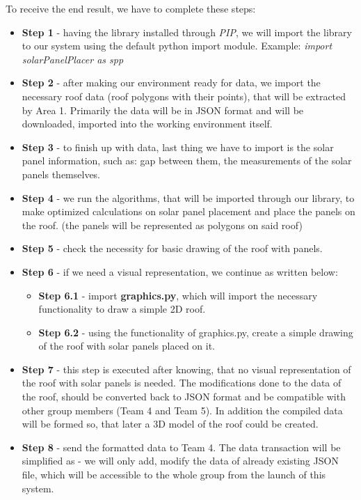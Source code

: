 \documentclass[a4paper,12pt,fleqn]{article}
\begin{document}
To receive the end result, we have to complete these steps:
\begin{itemize}
    \item \textbf{Step 1} - having the library installed through \textit{PIP}, we will import the library to our system using the default python import module. Example: \textit{import solarPanelPlacer as spp}
    \item \textbf{Step 2} - after making our environment ready for data, we import the necessary roof data (roof polygons with their points), that will be extracted by Area 1. Primarily the data will be in JSON format and will be downloaded, imported into the working environment itself.
    \item \textbf{Step 3} - to finish up with data, last thing we have to import is the solar panel information, such as: gap between them, the measurements of the solar panels themselves.
    \item \textbf{Step 4} - we run the algorithms, that will be imported through our library, to make optimized calculations on solar panel placement and place the panels on the roof. (the panels will be represented as polygons on said roof)
    \item \textbf{Step 5} - check the necessity for basic drawing of the roof with panels.
    \item \textbf{Step 6} - if we need a visual representation, we continue as written below:
    \begin{itemize}
        \item \textbf{Step 6.1} - import \textbf{graphics.py}, which will import the necessary functionality to draw a simple 2D roof.
        \item \textbf{Step 6.2} - using the functionality of graphics.py, create a simple drawing of the roof with solar panels placed on it.
    \end{itemize}
    \item \textbf{Step 7} - this step is executed after knowing, that no visual representation of the roof with solar panels is needed. The modifications done to the data of the roof, should be converted back to JSON format and be compatible with other group members (Team 4 and Team 5). In addition the compiled data will be formed so, that later a 3D model of the roof could be created.
    \item \textbf{Step 8} - send the formatted data to Team 4. The data transaction will be simplified as - we will only add, modify the data of already existing JSON file, which will be accessible to the whole group from the launch of this system.
\end{itemize}
\end{document}
